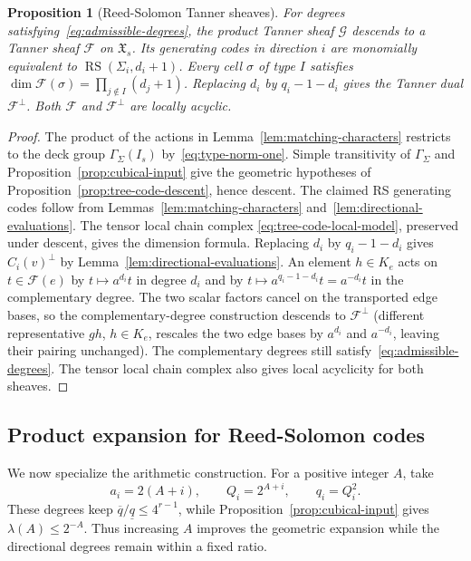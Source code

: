 \documentclass[11pt,letterpaper]{article}
\renewcommand{\le}{\leqslant}
\newtheorem{proposition}[theorem]{Proposition}
\theoremstyle{definition}
\theoremstyle{remark}
\newcommand{\cF}{\mathcal F}
\newcommand{\X}{\mathfrak{X}}
\newcommand{\RS}{\operatorname{RS}}
\begin{document}
\begin{proposition}[Reed-Solomon Tanner sheaves]
\label{prop:rs-sheaf}
For degrees satisfying~\eqref{eq:admissible-degrees}, the product
Tanner sheaf $\mathcal G$ descends to a Tanner sheaf $\cF$ on $\X_s$.
Its generating codes in direction $i$ are monomially equivalent
to $\RS(\Sigma_i,d_i+1)$.
Every cell $\sigma$ of type $I$ satisfies
$\dim\cF(\sigma)=\prod_{j\notin I}(d_j+1)$.
Replacing $d_i$ by $q_i-1-d_i$ gives the Tanner dual $\cF^\perp$.
Both $\cF$ and $\cF^\perp$ are locally acyclic.
\end{proposition}
\begin{proof}
The product of the actions in Lemma~\ref{lem:matching-characters}
restricts to the deck group $\Gamma_\Sigma(I_s)$
by~\eqref{eq:type-norm-one}.
Simple transitivity of $\Gamma_\Sigma$ and
Proposition~\ref{prop:cubical-input} give the geometric hypotheses
of Proposition~\ref{prop:tree-code-descent}, hence descent.
The claimed RS generating codes follow from
Lemmas~\ref{lem:matching-characters} and~\ref{lem:directional-evaluations}.
The tensor local chain complex
\eqref{eq:tree-code-local-model}, preserved under descent, gives
the dimension formula.
Replacing $d_i$ by $q_i-1-d_i$ gives $C_i(v)^\perp$ by
Lemma~\ref{lem:directional-evaluations}. An element $h\in K_e$ acts on
$t\in\cF(e)$ by $t\mapsto a^{d_i}t$ in degree $d_i$ and by
$t\mapsto a^{q_i-1-d_i}t=a^{-d_i}t$ in the complementary degree.
The two scalar factors cancel on the transported edge bases, so
the complementary-degree construction descends to $\cF^\perp$ (different representative $gh$, $h\in K_e$, rescales the two edge bases by
$a^{d_i}$ and $a^{-d_i}$, leaving their pairing unchanged).
The complementary degrees still satisfy~\eqref{eq:admissible-degrees}.
The tensor local chain complex also gives local acyclicity for both sheaves.
\end{proof}

\iffalse
\subsection{Product expansion for Reed-Solomon codes}
\label{sec:local-chain}

We now specialize the arithmetic construction. For a positive
integer $A$, take
\begin{equation}
 a_i=2(A+i),\qquad Q_i=2^{A+i},\qquad q_i=Q_i^2.
 \label{eq:field-size-choice}
\end{equation}
These degrees keep $\overline q/\underline q\le4^{r-1}$, while
Proposition~\ref{prop:cubical-input} gives $\lambda(A)\le2^{-A}$.
Thus increasing $A$ improves the geometric expansion while the
directional degrees remain within a fixed ratio.
\end{document}
